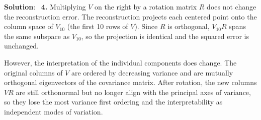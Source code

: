 \documentclass[submit]{../harvardml}
\newenvironment{solution}{%
    \vspace{2mm}\color{blue}\noindent\textbf{Solution}:\ }
{}
\begin{document}
\begin{solution}
\textbf{4.} Multiplying $V$ on the right by a rotation matrix $R$ does not change the reconstruction error. The reconstruction projects each centered point onto the column space of $V_{10}$ (the first 10 rows of $V$). Since $R$ is orthogonal, $V_{10} R$ spans the same subspace as $V_{10}$, so the projection is identical and the squared error is unchanged.

However, the interpretation of the individual components does change. The original columns of $V$ are ordered by decreasing variance and are mutually orthogonal eigenvectors of the covariance matrix. After rotation, the new columns $VR$ are still orthonormal but no longer align with the principal axes of variance, so they lose the most variance first ordering and the interpretability as independent modes of variation.

\end{solution}
\end{document}
